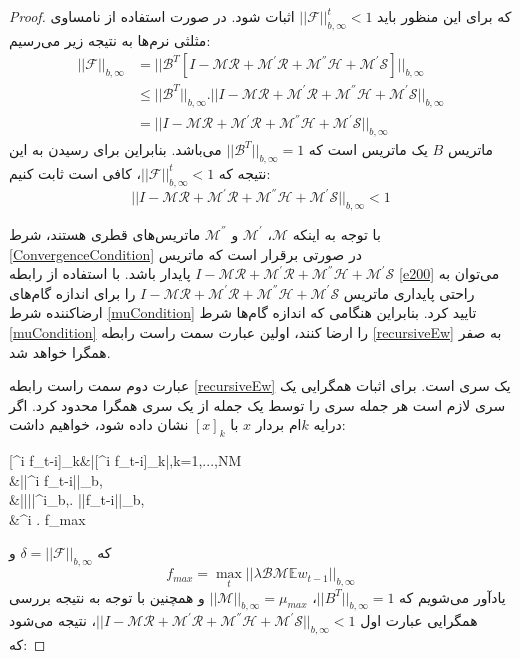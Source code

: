 \begin{proof}
	که برای این منظور باید $||\mathcal{F}||^t_{b,\infty}<1$ اثبات شود. در صورت استفاده از نامساوی مثلثی نرم‌ها به نتیجه زیر می‌رسیم:
	\begin{equation}
		\begin{split}
			||\mathcal{F}||_{b,\infty}&=||\mathcal{B}^T[I-\mathcal{M}\mathcal{R}+\mathcal{M}^{'}\mathcal{R}+\mathcal{M}^{''}\mathcal{H}+\mathcal{M}^{'}\mathcal{S}]||_{b,\infty}\\
			&\le ||\mathcal{B}^T||_{b,\infty} . ||I-\mathcal{M}\mathcal{R}+\mathcal{M}^{'}\mathcal{R}+\mathcal{M}^{''}\mathcal{H}+\mathcal{M}^{'}\mathcal{S}||_{b,\infty}\\
			&=||I-\mathcal{M}\mathcal{R}+\mathcal{M}^{'}\mathcal{R}+\mathcal{M}^{''}\mathcal{H}+\mathcal{M}^{'}\mathcal{S}||_{b,\infty}
		\end{split}
	\end{equation}	
	ماتریس $B$ یک ماتریس  است که $||\mathcal{B}^T||_{b,\infty}=1$ می‌باشد. بنابراین برای رسیدن به این نتیجه که  $||\mathcal{F}||^t_{b,\infty}<1$، کافی است ثابت کنیم:
	\begin{equation}\label{ConvergenceCondition}
		||I-\mathcal{M}\mathcal{R}+\mathcal{M}^{'}\mathcal{R}+\mathcal{M}^{''}\mathcal{H}+\mathcal{M}^{'}\mathcal{S}||_{b,\infty}<1
	\end{equation}
	
	با توجه به اینکه $\mathcal{M}$، $\mathcal{M}^{'}$ و $\mathcal{M}^{''}$ ماتریس‌های قطری هستند، شرط \ref{ConvergenceCondition} در صورتی برقرار است که ماتریس $I-\mathcal{M}\mathcal{R}+\mathcal{M}^{'}\mathcal{R}+\mathcal{M}^{''}\mathcal{H}+\mathcal{M}^{'}\mathcal{S}$ پایدار باشد. با استفاده از رابطه \ref{e200} می‌توان به راحتی پایداری ماتریس $I-\mathcal{M}\mathcal{R}+\mathcal{M}^{'}\mathcal{R}+\mathcal{M}^{''}\mathcal{H}+\mathcal{M}^{'}\mathcal{S}$ را برای اندازه گام‌های ارضاکننده شرط \ref{muCondition} تایید کرد. بنابراین هنگامی که اندازه گام‌ها شرط \ref{muCondition} را ارضا کنند، اولین عبارت سمت راست رابطه \ref{recursiveEw} به صفر همگرا خواهد شد.
	
	عبارت دوم سمت راست رابطه \ref{recursiveEw} یک سری است. برای اثبات همگرایی یک سری لازم است هر جمله سری را توسط یک جمله از یک سری همگرا محدود کرد. اگر درایه $k$ام بردار $x$ با $[x]_k$ نشان داده شود، خواهیم داشت:
	\begin{flalign}\label{e301}
		[^i f_{t-i}]_k&\le |[^i f_{t-i}]_k|,\qquad k=1,...,NM\\		
		&\le ||^i f_{t-i}||_{b,\infty}\\
		&\le ||||^i_{b,\infty}. ||f_{t-i}||_{b,\infty}\\
		&\le \delta^i . f_{max}
	\end{flalign}
	که $\delta=||\mathcal{F}||_{b,\infty}$ و 
	\begin{equation}
		f_{max}=\max_t ||\lambda\mathcal{B}\mathcal{M}\mathbb{E}w_{t-1}||_{b,\infty}
	\end{equation}
	یادآور می‌شویم که $||B^T||_{b,\infty}=1$، $||\mathcal{M}||_{b,\infty}=\mu_{max}$	و همچنین با توجه به نتیجه بررسی همگرایی عبارت اول  $||I-\mathcal{M}\mathcal{R}+\mathcal{M}^{'}\mathcal{R}+\mathcal{M}^{''}\mathcal{H}+\mathcal{M}^{'}\mathcal{S}||_{b,\infty}<1$، نتیجه می‌شود که:
	

\end{proof}
